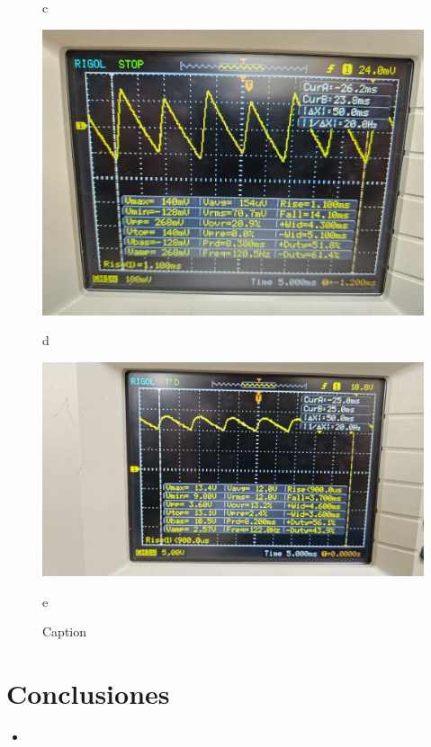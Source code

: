 \documentclass[10pt,letterpaper]{article}
\begin{document}
\begin{figure}[H]
\begin{minipage}[b]{0.45\textwidth}
        \caption*{c}
    \end{minipage}
    \begin{minipage}[b]{0.45\textwidth}
        \centering
        \includegraphics[scale=0.15]{Filtrado6.jpg}
        \caption*{d}
    
    \end{minipage}
    \hfill
    \begin{minipage}[b]{0.45\textwidth}
        \centering
        \includegraphics[scale=0.15]{Filtrado10.jpg}
        \caption*{e}
    \end{minipage}
    \caption{Caption}
    \label{fig:nose}
\end{figure}

\section{Conclusiones}
\begin{itemize}
	\item








\end{itemize}

\begin{thebibliography}{9}
\end{thebibliography}
\end{document}
